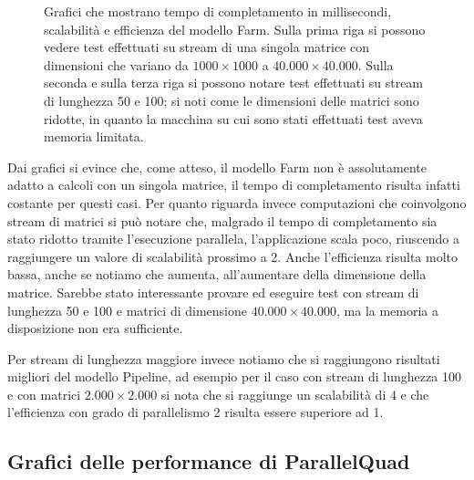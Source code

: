 \documentclass[a4paper,10pt]{article}
\begin{document}
\begin{landscape}
\begin{figure}[ht]
\caption{\small{Grafici che mostrano tempo di completamento in millisecondi, scalabilit\`a e efficienza del modello \textsf{Farm}. Sulla prima riga si possono vedere test effettuati su stream di una singola matrice con dimensioni che variano da $1000 \times 1000$ a $40.000 \times 40.000$. Sulla seconda e sulla terza riga si possono notare test effettuati su stream di lunghezza 50 e 100; si noti come le dimensioni delle matrici sono ridotte, in quanto la macchina su cui sono stati effettuati test aveva memoria limitata.}}
\label{fig:farm}

\end{figure}

Dai grafici si evince che, come atteso, il modello \textsf{Farm} non \`e assolutamente adatto a calcoli con un singola matrice, il tempo di completamento risulta infatti costante per questi casi. Per quanto riguarda invece computazioni che coinvolgono stream di matrici si pu\`o notare che, malgrado il tempo di completamento sia stato ridotto tramite l'esecuzione parallela, l'applicazione scala poco, riuscendo a raggiungere un valore di scalabilit\`a prossimo a 2. Anche l'efficienza risulta molto bassa, anche se notiamo che aumenta, all'aumentare della dimensione della matrice. Sarebbe stato interessante provare ed eseguire test con stream di lunghezza 50 e 100 e matrici di dimensione $40.000 \times 40.000$, ma la memoria a disposizione non era sufficiente.

Per stream di lunghezza maggiore invece notiamo che si raggiungono risultati migliori del modello \textsf{Pipeline}, ad esempio per il caso con stream di lunghezza 100 e con matrici $2.000 \times 2.000$ si nota che si raggiunge un scalabilit\`a di 4 e che l'efficienza con grado di parallelismo 2 risulta essere superiore ad 1.



\subsection{Grafici delle performance di \textsf{ParallelQuad}}


\end{landscape}
\end{document}
